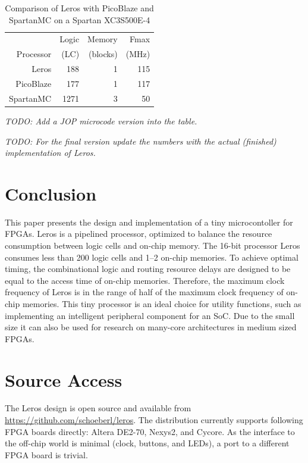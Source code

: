 \documentclass[a4paper,fontsize=10pt,twoside,DIV15,BCOR12mm,headinclude=true,footinclude=false,pagesize,bibtotoc]{scrbook}
\newcommand{\todo}[1]{{\emph{TODO: #1}}}
\begin{document}
\begin{table}
\small
\centering 
\caption{Comparison of Leros with PicoBlaze and SpartanMC on a Spartan XC3S500E-4}
\label{tab:comp}
\begin{tabular}{rrrr}
\toprule
 & Logic & Memory & Fmax \\
 Processor & (LC) & (blocks) & (MHz) \\
\midrule
Leros & 188 & 1 & 115 \\
PicoBlaze & 177 & 1 & 117 \\
SpartanMC & 1271 & 3 & 50 \\
\bottomrule
\end{tabular}
\end{table}
\todo{Add a JOP microcode version into the table.}

\todo{For the final version update the numbers with the actual (finished) implementation of Leros.}

\section{Conclusion}
\label{sec:conclusion}

This paper presents the design and implementation of a tiny microcontoller for FPGAs. Leros is a pipelined processor, optimized to balance the resource consumption between logic cells and on-chip memory. The 16-bit processor Leros consumes less than 200 logic cells and 1--2 on-chip memories.
To achieve optimal timing, the combinational logic and routing resource delays are designed to be equal to the access time of on-chip memories. Therefore, the maximum clock frequency of Leros is in the range of half of the maximum clock frequency of on-chip memories. This tiny processor is an ideal choice for utility functions, such as implementing an intelligent peripheral component for an SoC. Due to the small size it can also be used for research on many-core architectures in medium sized FPGAs.


\section*{Source Access}

The Leros design is open source and available from \url{https://github.com/schoeberl/leros}. The distribution currently supports following FPGA boards directly: Altera DE2-70, Nexys2, and Cycore. As the interface to the off-chip world is minimal (clock, buttons, and LEDs), a port to a different FPGA board is trivial.
\end{document}

